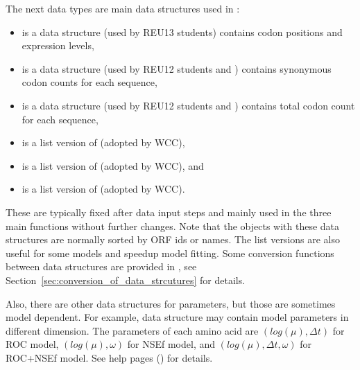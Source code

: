 The next data types are main data structures used in :
\begin{itemize}
\item {} is a data structure (used by REU13 students)
      contains codon positions and expression levels,
\item {} is a data structure
      (used by REU12 students and \citet{Wallace2013})
      contains synonymous codon counts for each sequence,
\item {} is a data structure
      (used by REU12 students and \citet{Wallace2013})
      contains total codon count for each sequence,
\item {} is a list version of  (adopted by WCC),
\item {} is a list version of  (adopted by WCC), and
\item {} is a list version of  (adopted by WCC).
\end{itemize}
These are typically fixed after data input steps and
mainly used in the three main functions without further changes.
Note that the objects with these data structures are normally sorted
by ORF ids or names. The list versions are also useful for some models
and speedup model fitting. Some conversion functions between data structures
are provided in , see
Section~\ref{sec:conversion_of_data_strcutures} for details.

Also, there are other data structures for parameters, but those are
sometimes model dependent. For example, data structure  may contain
model parameters in different dimension.
The parameters of each amino acid are
$(log(\mu), \Delta t)$ for ROC model,
$(log(\mu), \omega)$ for NSEf model, and
$(log(\mu), \Delta t, \omega)$ for ROC+NSEf model.
See help pages () for details.

